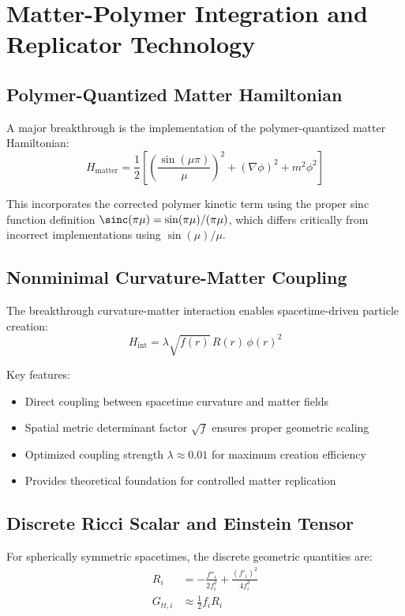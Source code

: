\documentclass[11pt]{article}
\begin{document}
\section{Matter-Polymer Integration and Replicator Technology}

\subsection{Polymer-Quantized Matter Hamiltonian}

A major breakthrough is the implementation of the polymer-quantized matter Hamiltonian:
\begin{equation}
H_{\text{matter}} = \frac{1}{2}\left[\left(\frac{\sin(\mu\pi)}{\mu}\right)^2 + (\nabla\phi)^2 + m^2\phi^2\right]
\end{equation}

This incorporates the corrected polymer kinetic term using the proper sinc function definition $\sinc(\pi\mu) = \sin(\pi\mu)/(\pi\mu)$, which differs critically from incorrect implementations using $\sin(\mu)/\mu$.

\subsection{Nonminimal Curvature-Matter Coupling}

The breakthrough curvature-matter interaction enables spacetime-driven particle creation:
\begin{equation}
H_{\text{int}} = \lambda\sqrt{f(r)}\,R(r)\,\phi(r)^2
\end{equation}

Key features:
\begin{itemize}
\item Direct coupling between spacetime curvature and matter fields
\item Spatial metric determinant factor $\sqrt{f}$ ensures proper geometric scaling
\item Optimized coupling strength $\lambda \approx 0.01$ for maximum creation efficiency
\item Provides theoretical foundation for controlled matter replication
\end{itemize}

\subsection{Discrete Ricci Scalar and Einstein Tensor}

For spherically symmetric spacetimes, the discrete geometric quantities are:
\begin{align}
R_i &= -\frac{f''_i}{2f_i^2} + \frac{(f'_i)^2}{4f_i^3} \\
G_{tt,i} &\approx \frac{1}{2}f_i R_i
\end{align}
\end{document}
